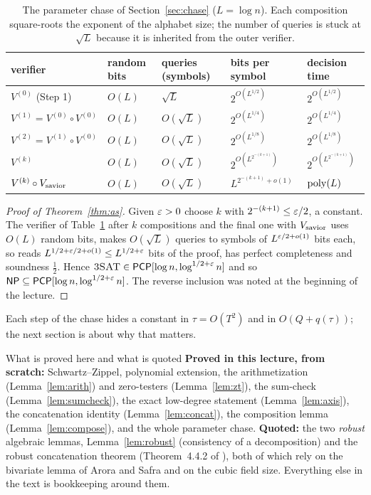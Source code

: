 \begin{table}[t]
\centering\small
\renewcommand{\arraystretch}{1.25}
\begin{tabular}{@{}lllll@{}}
\toprule
verifier & random bits & queries (symbols) & bits per symbol & decision time\\
\midrule
$V^{(0)}$ (Step 1) & $O(L)$ & $\sqrt L$ & $2^{O(L^{1/2})}$ & $2^{O(L^{1/2})}$\\
$V^{(1)}=V^{(0)}\circ V^{(0)}$ & $O(L)$ & $O(\sqrt L)$ & $2^{O(L^{1/4})}$ & $2^{O(L^{1/4})}$\\
$V^{(2)}=V^{(1)}\circ V^{(0)}$ & $O(L)$ & $O(\sqrt L)$ & $2^{O(L^{1/8})}$ & $2^{O(L^{1/8})}$\\
$V^{(k)}$ & $O(L)$ & $O(\sqrt L)$ & $2^{O(L^{2^{-(k+1)}})}$ & $2^{O(L^{2^{-(k+1)}})}$\\
$V^{(k)}\circ V_{\rm savior}$ & $O(L)$ & $O(\sqrt L)$ & $L^{2^{-(k+1)}+o(1)}$ & $\operatorname{poly}(L)$\\
\bottomrule
\end{tabular}
\caption{The parameter chase of Section~\ref{sec:chase} ($L=\log n$).  Each composition square-roots the exponent of the alphabet size; the number of queries is stuck at $\sqrt L$ because it is inherited from
the outer verifier.}
\label{tab:chase}
\end{table}

\begin{proof}[Proof of Theorem~\ref{thm:as}]
Given $\varepsilon>0$ choose $k$ with $2^{-(k+1)}\le\varepsilon/2$, a constant.  The verifier of Table~\ref{tab:chase} after $k$ compositions and the final one with $V_{\rm savior}$ uses $O(L)$ random bits,
makes $O(\sqrt L)$ queries to symbols of $L^{\varepsilon/2+o(1)}$ bits each, so reads $L^{1/2+\varepsilon/2+o(1)}\le L^{1/2+\varepsilon}$ bits of the proof, has perfect completeness and soundness $\tfrac12$.
Hence $\textsc{3SAT}\in\mathsf{PCP}[\log n,\log^{1/2+\varepsilon}n]$ and so $\mathsf{NP}\subseteq\mathsf{PCP}[\log n,\log^{1/2+\varepsilon}n]$.  The reverse inclusion was noted at the beginning of the lecture.
\end{proof}

\noindent
Each step of the chase hides a constant in $\tau=O(T^2)$ and in $O(Q+q(\tau))$; the next section is about why that matters.

\begin{bigpicture}{What is proved here and what is quoted}
\textbf{Proved in this lecture, from scratch:} Schwartz--Zippel, polynomial extension, the arithmetization (Lemma~\ref{lem:arith}) and zero-testers (Lemma~\ref{lem:zt}), the sum-check (Lemma~\ref{lem:sumcheck}), the exact low-degree
statement (Lemma~\ref{lem:axis}), the concatenation identity (Lemma~\ref{lem:concat}), the composition lemma (Lemma~\ref{lem:compose}), and the whole parameter chase.
\textbf{Quoted:} the two \emph{robust} algebraic lemmas, Lemma~\ref{lem:robust} (consistency of a decomposition) and the robust concatenation theorem (Theorem~4.4.2 of \citealp{AroraSafra98}), both of which rely on
the bivariate lemma of Arora and Safra and on the cubic field size.  Everything else in the text is bookkeeping around them.
\end{bigpicture}


